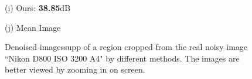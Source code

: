 \documentclass[10pt,onecolumn,letterpaper]{article}
\begin{document}
\begin{figure}[H]
{\begin{minipage}[t]{0.196\textwidth}
{\footnotesize (i) Ours: \textbf{38.85}dB  }
\end{minipage}
\begin{minipage}[t]{0.196\textwidth}
\centering
{}
{\footnotesize (j) Mean Image \cite{crosschannel2016} }
\end{minipage}
}
\caption{Denoised imagessupp of a region cropped from the real noisy image ``Nikon D800 ISO 3200 A4" \cite{crosschannel2016} by different methods. The images are better viewed by zooming in on screen.} 
\label{fig19}
\end{figure}
\end{document}
